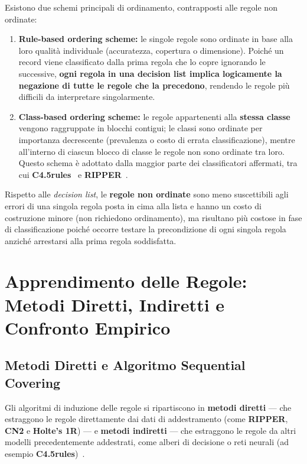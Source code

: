 Esistono due schemi principali di ordinamento, contrapposti alle regole non ordinate:
\begin{enumerate}
    \item \textbf{Rule-based ordering scheme:} le singole regole sono ordinate in base alla loro qualit\`a individuale (accuratezza, copertura o dimensione). Poich\'e un record viene classificato dalla prima regola che lo copre ignorando le successive, \textbf{ogni regola in una decision list implica logicamente la negazione di tutte le regole che la precedono}, rendendo le regole pi\`u difficili da interpretare singolarmente.
    \item \textbf{Class-based ordering scheme:} le regole appartenenti alla \textbf{stessa classe} vengono raggruppate in blocchi contigui; le classi sono ordinate per importanza decrescente (prevalenza o costo di errata classificazione), mentre all'interno di ciascun blocco di classe le regole non sono ordinate tra loro. Questo schema \`e adottato dalla maggior parte dei classificatori affermati, tra cui \textbf{C4.5rules}~\cite{quinlan1993} e \textbf{RIPPER}~\cite{cohen1995}.
\end{enumerate}

Rispetto alle \textit{decision list}, le \textbf{regole non ordinate} sono meno suscettibili agli errori di una singola regola posta in cima alla lista e hanno un costo di costruzione minore (non richiedono ordinamento), ma risultano pi\`u costose in fase di classificazione poich\'e occorre testare la precondizione di ogni singola regola anzich\'e arrestarsi alla prima regola soddisfatta.

\FloatBarrier
\section{Apprendimento delle Regole: Metodi Diretti, Indiretti e Confronto Empirico}
\label{sec:dm-rule-learning}

\FloatBarrier
\subsection{Metodi Diretti e Algoritmo Sequential Covering}
\label{subsec:dm-sequential-covering}

Gli algoritmi di induzione delle regole si ripartiscono in \textbf{metodi diretti} --- che estraggono le regole direttamente dai dati di addestramento (come \textbf{RIPPER}, \textbf{CN2} e \textbf{Holte's 1R}) --- e \textbf{metodi indiretti} --- che estraggono le regole da altri modelli precedentemente addestrati, come alberi di decisione o reti neurali (ad esempio \textbf{C4.5rules})~\cite{tan2018}.

